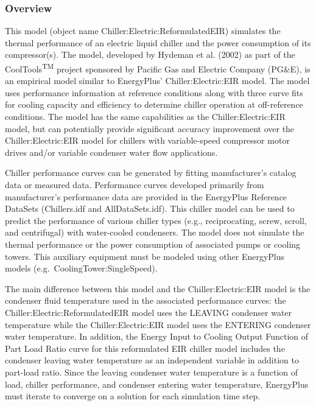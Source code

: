 \subsubsection{Overview}\label{overview-3-002}

This model (object name Chiller:Electric:ReformulatedEIR) simulates the thermal performance of an electric liquid chiller and the power consumption of its compressor(s). The model, developed by Hydeman et al. (2002) as part of the CoolTools\textsuperscript{TM} project sponsored by Pacific Gas and Electric Company (PG\&E), is an empirical model similar to EnergyPlus' Chiller:Electric:EIR model. The model uses performance information at reference conditions along with three curve fits for cooling capacity and efficiency to determine chiller operation at off-reference conditions. The model has the same capabilities as the Chiller:Electric:EIR model, but can potentially provide significant accuracy improvement over the Chiller:Electric:EIR model for chillers with variable-speed compressor motor drives and/or variable condenser water flow applications.

Chiller performance curves can be generated by fitting manufacturer's catalog data or measured data. Performance curves developed primarily from manufacturer's performance data are provided in the EnergyPlus Reference DataSets (Chillers.idf and AllDataSets.idf). This chiller model can be used to predict the performance of various chiller types (e.g., reciprocating, screw, scroll, and centrifugal) with water-cooled condensers. The model does not simulate the thermal performance or the power consumption of associated pumps or cooling towers. This auxiliary equipment must be modeled using other EnergyPlus models (e.g.~CoolingTower:SingleSpeed).

The main difference between this model and the Chiller:Electric:EIR model is the condenser fluid temperature used in the associated performance curves: the Chiller:Electric:ReformulatedEIR model uses the LEAVING condenser water temperature while the Chiller:Electric:EIR model uses the ENTERING condenser water temperature. In addition, the Energy Input to Cooling Output Function of Part Load Ratio curve for this reformulated EIR chiller model includes the condenser leaving water temperature as an independent variable in addition to part-load ratio. Since the leaving condenser water temperature is a function of load, chiller performance, and condenser entering water temperature, EnergyPlus must iterate to converge on a solution for each simulation time step.

